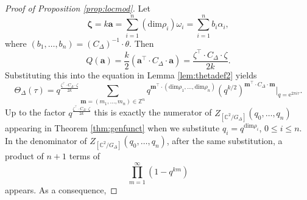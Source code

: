 \documentclass[11pt,a4paper]{amsart}
\theoremstyle{definition}
\newcommand{\SZ}{\mathbb{Z}}                    %
\newcommand{\SC}{\mathbb{C}}                    %
\begin{document}
\begin{proof}[{Proof of Proposition \ref{prop:locmod}}]
Let
\begin{equation}\mathbf{\zeta}= k\mathbf{a}=\sum_{i=1}^n (\mathrm{dim} \rho_i) \omega_i=\sum_{i=1}^n b_i \alpha_i,
\label{eq:zetasub}
\end{equation}
where $(b_1,\dots,b_n)=(C_\Delta)^{-1} \cdot \theta$.
Then
\[ Q(\mathbf{a})=\frac{k}{2}\left(\mathbf{a}^\top \cdot C_\Delta \cdot \mathbf{a}\right)=  \frac{\zeta^\top \cdot C_\Delta \cdot \zeta}{2k}. \]
Substituting this into the equation in Lemma \ref{lem:thetadef2} yields
\begin{equation*} 
\Theta_{ \Delta }(\tau )= q^{\frac{\zeta^\top \cdot C_\Delta \cdot \zeta}{2k}}\sum_{ \mathbf{m}=(m_1,\dots,m_n) \in \SZ^n } q^{\mathbf{m}^\top \cdot ( \mathrm{dim} \rho_1 ,\dots, \mathrm{dim} \rho_n) } (q^{k/2})^{\mathbf{m}^\top \cdot C_\Delta \cdot \mathbf{m}}\Big|_{q=\mathrm{e}^{2 \pi i \tau}}. 
\end{equation*}
Up to the factor $q^{ \frac{\zeta^\top \cdot C_\Delta \cdot \zeta}{2k}}$ this is exactly the numerator of $Z_{[\SC^2/G_\Delta]}(q_0,\dots,q_n)$ appearing in Theorem \ref{thm:genfunct} when we substitute $q_i=q^{\mathrm{dim} \rho_i}$, $0 \leq i \leq n$. In the denominator of $Z_{[\SC^2/G_\Delta]}(q_0,\dots,q_n)$, after the same substitution, a product of $n+1$ terms of 
\[\prod_{m=1}^{\infty}(1-q^{km})\] 
appears. As a consequence,

\end{proof}
\end{document}
